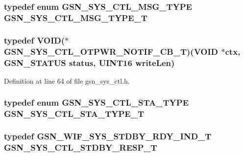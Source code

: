 \label{a00592_ae713524f000e16863094cf95d735914f}
\hypertarget{a00592_a178e119be14397a7bc5fdd415b454dac}{
\subsubsection[{GSN\_\-SYS\_\-CTL\_\-MSG\_\-TYPE\_\-T}]{\setlength{\rightskip}{0pt plus 5cm}typedef enum {\bf GSN\_\-SYS\_\-CTL\_\-MSG\_\-TYPE} {\bf GSN\_\-SYS\_\-CTL\_\-MSG\_\-TYPE\_\-T}}}
\label{a00592_a178e119be14397a7bc5fdd415b454dac}
\hypertarget{a00592_a0f838274b37f0a1f10e78dca5fcc9e80}{
\subsubsection[{GSN\_\-SYS\_\-CTL\_\-OTPWR\_\-NOTIF\_\-CB\_\-T}]{\setlength{\rightskip}{0pt plus 5cm}typedef VOID($\ast$ {\bf GSN\_\-SYS\_\-CTL\_\-OTPWR\_\-NOTIF\_\-CB\_\-T})(VOID $\ast$ctx, {\bf GSN\_\-STATUS} status, {\bf UINT16} writeLen)}}
\label{a00592_a0f838274b37f0a1f10e78dca5fcc9e80}


Definition at line 64 of file gsn\_\-sys\_\-ctl.h.

\hypertarget{a00592_ab00e389970e76c88cef321d6cf1559ec}{
\subsubsection[{GSN\_\-SYS\_\-CTL\_\-STA\_\-TYPE\_\-T}]{\setlength{\rightskip}{0pt plus 5cm}typedef enum {\bf GSN\_\-SYS\_\-CTL\_\-STA\_\-TYPE} {\bf GSN\_\-SYS\_\-CTL\_\-STA\_\-TYPE\_\-T}}}
\label{a00592_ab00e389970e76c88cef321d6cf1559ec}
\hypertarget{a00592_aa812bcee0c0382527fcbd265786f8ef6}{
\subsubsection[{GSN\_\-SYS\_\-CTL\_\-STDBY\_\-RESP\_\-T}]{\setlength{\rightskip}{0pt plus 5cm}typedef {\bf GSN\_\-WIF\_\-SYS\_\-STDBY\_\-RDY\_\-IND\_\-T} {\bf GSN\_\-SYS\_\-CTL\_\-STDBY\_\-RESP\_\-T}}}
\label{a00592_aa812bcee0c0382527fcbd265786f8ef6}


